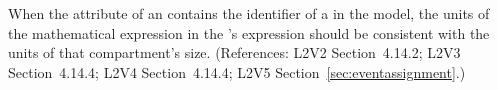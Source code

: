 When the  attribute of an \EventAssignment
contains the identifier of a \Compartment in the model, the
units of the mathematical expression in the
\EventAssignment's  expression should be
consistent with the units of that compartment's size.
(References: L2V2 Section~4.14.2; L2V3 Section~4.14.4; L2V4 Section~4.14.4; L2V5 Section~\ref{sec:eventassignment}.)
